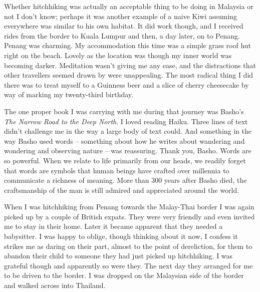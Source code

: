 Whether hitchhiking was actually an acceptable thing to be doing in
Malaysia or not I don't know; perhaps it was another example of a naive
Kiwi assuming everywhere was similar to his own habitat. It did work
though, and I received rides from the border to Kuala Lumpur and then, a
day later, on to Penang. Penang was charming. My accommodation this time
was a simple grass roof hut right on the beach. Lovely as the location
was though my inner world was becoming darker. Meditation wasn't giving
me any ease, and the distractions that other travellers seemed drawn by
were unappealing. The most radical thing I did there was to treat myself
to a Guinness beer and a slice of cherry cheesecake by way of marking my
twenty-third birthday.

The one proper book I was carrying with me during that journey was
Basho's \emph{The Narrow Road to the Deep North}\cite{north}.
I loved reading Haiku. Three
lines of text didn't challenge me in the way a large body of text could.
And something in the way Basho used words -- something about how he
writes about wandering and wondering and observing nature -- was
reassuring. Thank you, Basho. Words are so powerful. When we relate to
life primarily from our heads, we readily forget that words are symbols
that human beings have crafted over millennia to communicate a richness
of meaning. More than 300 years after Basho died, the craftsmanship of
the man is still admired and appreciated around the world.

When I was hitchhiking from Penang towards the Malay-Thai border I was
again picked up by a couple of British expats. They were very friendly
and even invited me to stay in their home. Later it became apparent that
they needed a babysitter. I was happy to oblige, though thinking about
it now, I confess it strikes me as daring on their part, almost to the
point of dereliction, for them to abandon their child to someone they
had just picked up hitchhiking. I was grateful though and apparently so
were they. The next day they arranged for me to be driven to the border.
I was dropped on the Malaysian side of the border and walked across into
Thailand.

